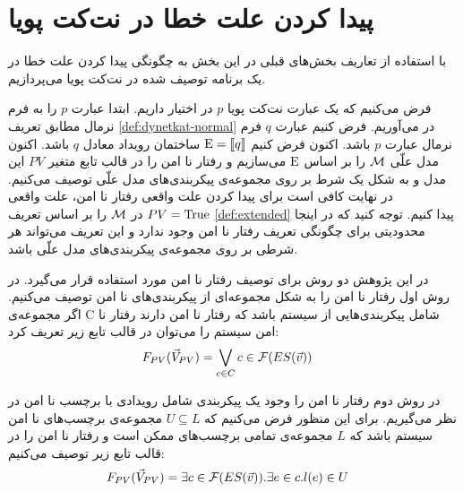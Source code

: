 \section{پیدا کردن علت خطا در نت‌کت پویا}

با استفاده از تعاریف بخش‌های قبلی در این بخش به چگونگی پیدا کردن علت خطا در یک برنامه توصیف شده در نت‌کت پویا می‌پردازیم.

فرض می‌کنیم که یک عبارت نت‌کت پویا
$p$
در اختیار داریم.
ابتدا عبارت
$p$
را به فرم نرمال مطابق تعریف 
\ref{def:dynetkat-normal}
در می‌آوریم.
فرض کنیم عبارت 
$q$
فرم نرمال
عبارت 
$p$
باشد.
اکنون فرض کنیم 
$\mathrm{E} = \llbracket q \rrbracket$
ساختمان رویداد معادل 
$q$
باشد.
اکنون مدل علّی 
$\mathcal{M}$
را بر اساس
$\mathrm{E}$
می‌سازیم و رفتار نا امن را در قالب تابع متغیر
$PV$
این مدل و به شکل یک شرط بر روی مجموعه‌ی پیکربندی‌های مدل علّی توصیف می‌کنیم.
در نهایت کافی است برای پیدا کردن علت واقعی رفتار نا امن، علت واقعی 
$PV = \mathrm{True}$
در 
$\mathcal{M}$
را بر اساس تعریف 
\ref{def:extended}
پیدا کنیم.
توجه کنید که در اینجا محدودیتی برای چگونگی تعریف رفتار نا امن وجود ندارد و این تعریف می‌تواند هر شرطی بر روی مجموعه‌ی پیکر‌بندی‌های مدل علّی باشد.

در این پژوهش دو روش برای توصیف رفتار نا امن مورد استفاده قرار می‌گیرد.
در روش اول رفتار نا امن را به شکل مجموعه‌ای از پیکر‌بندی‌های
نا امن توصیف می‌کنیم.
اگر مجموعه‌ی 
C
شامل پیکربندی‌هایی از سیستم باشد که رفتار نا امن دارند
رفتار نا امن سیستم را می‌توان در قالب تابع زیر تعریف کرد:
\begin{align*}
    F_{PV}(\vec V_{PV}) & = \bigvee_{c \in C} c \in \mathcal{F}(ES(\vec v))
\end{align*}

در روش دوم رفتار نا امن را وجود یک پیکربندی شامل رویدادی 
با برچسب نا امن در نظر می‌گیریم.
برای این منظور فرض می‌کنیم که 
$U \subseteq L$
مجموعه‌ی برچسب‌های نا امن سیستم باشد که 
$L$
مجموعه‌ی تمامی برچسب‌های ممکن است و رفتار نا امن را در قالب تابع
زیر توصیف می‌کنیم:
\begin{align*}
    F_{PV}(\vec V_{PV}) & = \exists c \in \mathcal{F}(ES(\vec v)).\exists e \in c.
    l(e) \in U
\end{align*}



